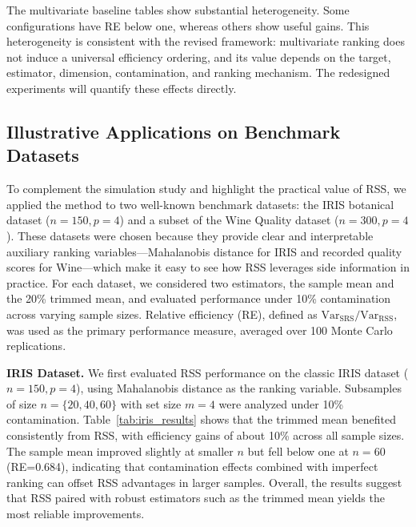 \documentclass[12pt]{article}
\makeatletter
\let\oldparagraph\paragraph
\renewcommand{\paragraph}{
    \@ifstarcorollary
      \xxxParagraphStar
      \xxxParagraphNoStar
  }
\newcommand{\xxxParagraphStar}[1]{\oldparagraph*{#1}\mbox{}}
\newcommand{\xxxParagraphNoStar}[1]{\oldparagraph{#1}\mbox{}}
\makeatother
\begin{document}
The multivariate baseline tables show substantial heterogeneity. Some configurations have RE below one, whereas others show useful gains. This heterogeneity is consistent with the revised framework: multivariate ranking does not induce a universal efficiency ordering, and its value depends on the target, estimator, dimension, contamination, and ranking mechanism. The redesigned experiments will quantify these effects directly.



\subsection{Illustrative Applications on Benchmark Datasets}\label{sec:realdata}
To complement the simulation study and highlight the practical value of RSS, we applied the method to two well-known benchmark datasets: the IRIS botanical dataset ($n=150, p=4$) and a subset of the Wine Quality dataset ($n=300, p=4$).
These datasets were chosen because they provide clear and interpretable auxiliary ranking variables—Mahalanobis distance for IRIS and recorded quality scores for Wine—which make it easy to see how RSS leverages side information in practice.
For each dataset, we considered two estimators, the sample mean and the 20\% trimmed mean, and evaluated performance under 10\% contamination across varying sample sizes.
Relative efficiency (RE), defined as $\text{Var}_{\text{SRS}}/\text{Var}_{\text{RSS}}$, was used as the primary performance measure, averaged over 100 Monte Carlo replications.

{\bf IRIS Dataset.}
We first evaluated RSS performance on the classic IRIS dataset ($n=150, p=4$), using Mahalanobis distance as the ranking variable.
Subsamples of size $n=\{20,40,60\}$ with set size $m=4$ were analyzed under 10\% contamination.
Table~\ref{tab:iris_results} shows that the trimmed mean benefited consistently from RSS, with efficiency gains of about 10\% across all sample sizes.
The sample mean improved slightly at smaller $n$ but fell below one at $n=60$ (RE=0.684), indicating that contamination effects combined with imperfect ranking can offset RSS advantages in larger samples.
Overall, the results suggest that RSS paired with robust estimators such as the trimmed mean yields the most reliable improvements.
\end{document}
